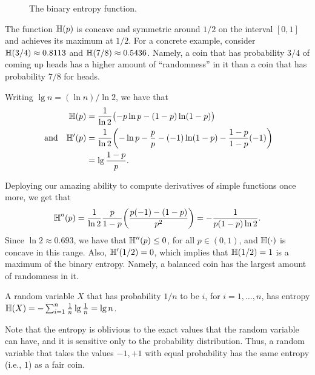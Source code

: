 \begin{figure}[h]
    \centerline{}
    \caption{The binary entropy function.}
\end{figure}

The function $\Entropy{p}$ is concave and symmetric around $1/2$ on the
interval $[0,1]$ and achieves its maximum at $1/2$. For a concrete
example, consider $\Entropy{3/4} \approx 0.8113$ and $\Entropy{7/8}
\approx 0.5436$. Namely, a coin that has probability $3/4$ of coming up heads
has a higher amount of ``randomness'' in it than a coin that has
probability $7/8$ for heads.

Writing $\lg n = (\ln n)/\ln 2$, we have that
\begin{align*}
  \Entropy{p} &=  \frac{1}{\ln
                2}\pth{\bigl.
                - p \ln p - (1-p)\ln (1-p) }\\
%
  \text{ and ~ }\EntropyChar'\pth{p} &=%
                                       \frac{1}{\ln 2}\pth{\MakeSBig - \ln p -\frac{p}{p} - (-1) \ln(1-p)
                                       - \frac{1-p}{1-p}(-1) }\\
                                       &= \lg \frac{1-p}{p}.
\end{align*}

Deploying our amazing ability to compute derivatives of simple
functions once more, we get that
\begin{equation*}
    \EntropyChar''\pth{p}%
    = %
    \frac{1}{\ln 2} \frac{p}{1-p} \pth{ \frac{p(-1) -(1-p)}{p^2}}
    = - \frac{1}{p (1-p) \ln 2}.
\end{equation*}
Since $\ln 2 \approx 0.693$, we have that $\mathbb{H}''(p) \leq 0$,
for all $p \in (0,1)$, and $\Entropy{\cdot}$ is concave in this
range. Also, $\mathbb{H}'(1/2) =0$, which implies that $\Entropy{1/2} =
1$ is a maximum of the binary entropy. Namely, a balanced coin has the
largest amount of randomness in it.

\begin{example}
    A random variable $X$ that has probability $1/n$ to be $i$, for
    $i=1,\ldots, n$, has entropy $\Entropy{X} = -\sum_{i=1}^n
    \frac{1}{n} \lg \frac{1}{n} = \lg n$.
\end{example}

Note that the entropy is oblivious to the exact values that the
random variable can have, and it is sensitive only to the probability
distribution. Thus, a random variable that takes the values $-1,+1$ with equal
probability has the same entropy (i.e., $1$) as a fair coin.

